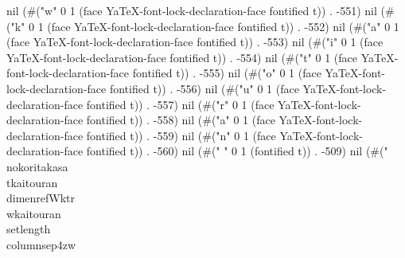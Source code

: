 nil (#("w" 0 1 (face YaTeX-font-lock-declaration-face fontified t)) . -551) nil (#("k" 0 1 (face YaTeX-font-lock-declaration-face fontified t)) . -552) nil (#("a" 0 1 (face YaTeX-font-lock-declaration-face fontified t)) . -553) nil (#("i" 0 1 (face YaTeX-font-lock-declaration-face fontified t)) . -554) nil (#("t" 0 1 (face YaTeX-font-lock-declaration-face fontified t)) . -555) nil (#("o" 0 1 (face YaTeX-font-lock-declaration-face fontified t)) . -556) nil (#("u" 0 1 (face YaTeX-font-lock-declaration-face fontified t)) . -557) nil (#("r" 0 1 (face YaTeX-font-lock-declaration-face fontified t)) . -558) nil (#("a" 0 1 (face YaTeX-font-lock-declaration-face fontified t)) . -559) nil (#("n" 0 1 (face YaTeX-font-lock-declaration-face fontified t)) . -560) nil (#("
" 0 1 (fontified t)) . -509) nil (#("\\nokoritakasa\\tkaitouran%
\\dimenref{Wktr}\\wkaitouran%
\\setlength{\\columnsep}{4zw}%

